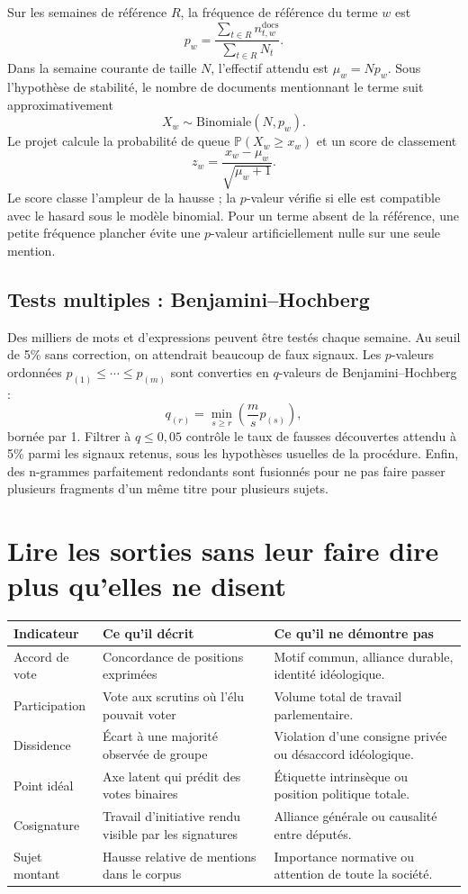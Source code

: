 \documentclass[11pt,a4paper]{article}
\newcommand{\Pp}{\mathbb{P}}
\begin{document}
Sur les semaines de référence $R$, la fréquence de référence du terme $w$ est
\[
 p_w=\frac{\sum_{t\in R}n_{t,w}^{\mathrm{docs}}}{\sum_{t\in R}N_t}.
\]
Dans la semaine courante de taille $N$, l'effectif attendu est
$\mu_w=Np_w$. Sous l'hypothèse de stabilité, le nombre de documents mentionnant
le terme suit approximativement
\[
 X_w\sim\mathrm{Binomiale}(N,p_w).
\]
Le projet calcule la probabilité de queue $\Pp(X_w\geq x_w)$ et un score de
classement
\[
 z_w=\frac{x_w-\mu_w}{\sqrt{\mu_w+1}}.
\]
Le score classe l'ampleur de la hausse ; la $p$-valeur vérifie si elle est
compatible avec le hasard sous le modèle binomial. Pour un terme absent de la
référence, une petite fréquence plancher évite une $p$-valeur artificiellement
nulle sur une seule mention.

\subsection{Tests multiples : Benjamini--Hochberg}

Des milliers de mots et d'expressions peuvent être testés chaque semaine. Au
seuil de 5\% sans correction, on attendrait beaucoup de faux signaux. Les
$p$-valeurs ordonnées $p_{(1)}\leq\cdots\leq p_{(m)}$ sont converties en
$q$-valeurs de Benjamini--Hochberg :
\[
 q_{(r)}=\min_{s\geq r}\left(\frac{m}{s}p_{(s)}\right),
\]
bornée par 1. Filtrer à $q\leq0{,}05$ contrôle le taux de fausses découvertes
attendu à 5\% parmi les signaux retenus, sous les hypothèses usuelles de la
procédure. Enfin, des n-grammes parfaitement redondants sont fusionnés pour ne
pas faire passer plusieurs fragments d'un même titre pour plusieurs sujets.

\section{Lire les sorties sans leur faire dire plus qu'elles ne disent}

\begin{center}
\begin{tabular}{>{\raggedright\arraybackslash}p{.25\linewidth}p{.31\linewidth}p{.31\linewidth}}
\toprule
Indicateur & Ce qu'il décrit & Ce qu'il ne démontre pas \\
\midrule
Accord de vote & Concordance de positions exprimées & Motif commun, alliance durable, identité idéologique. \\
Participation & Vote aux scrutins où l'élu pouvait voter & Volume total de travail parlementaire. \\
Dissidence & Écart à une majorité observée de groupe & Violation d'une consigne privée ou désaccord idéologique. \\
Point idéal & Axe latent qui prédit des votes binaires & Étiquette intrinsèque ou position politique totale. \\
Cosignature & Travail d'initiative rendu visible par les signatures & Alliance générale ou causalité entre députés. \\
Sujet montant & Hausse relative de mentions dans le corpus & Importance normative ou attention de toute la société. \\
\bottomrule
\end{tabular}
\end{center}
\end{document}
